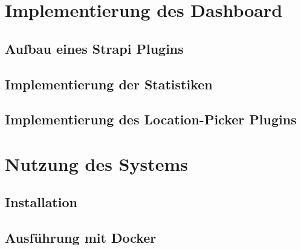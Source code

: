 





\section{Implementierung des Dashboard} \label{sec:impl-dashboard}

\subsection{Aufbau eines Strapi Plugins}

\subsection{Implementierung der Statistiken}

\subsection{Implementierung des Location-Picker Plugins}


\section{Nutzung des Systems}

\subsection{Installation}

\subsection{Ausführung mit Docker}